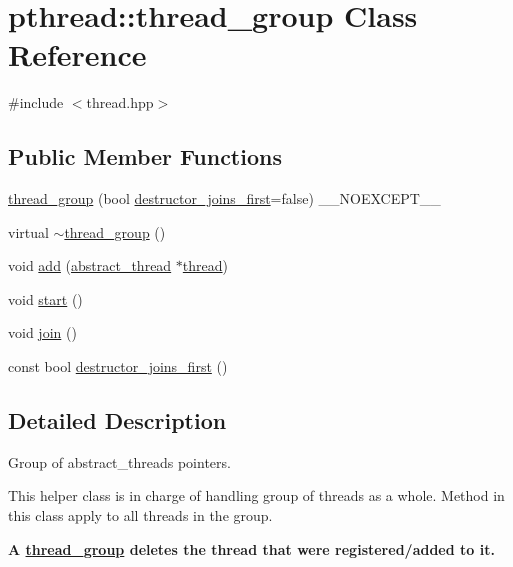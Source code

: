 \hypertarget{classpthread_1_1thread__group}{}\section{pthread\+:\+:thread\+\_\+group Class Reference}
\label{classpthread_1_1thread__group}


{\ttfamily \#include $<$thread.\+hpp$>$}

\subsection*{Public Member Functions}
\begin{DoxyCompactItemize}
\item 
\hyperlink{classpthread_1_1thread__group_ab4a8be5396449131ce2817db0e6ea2c2}{thread\+\_\+group} (bool \hyperlink{classpthread_1_1thread__group_a67df7bb484fb8657228a909a126489d3}{destructor\+\_\+joins\+\_\+first}=false) \+\_\+\+\_\+\+N\+O\+E\+X\+C\+E\+P\+T\+\_\+\+\_\+
\item 
virtual \hyperlink{classpthread_1_1thread__group_a2aeeb86d1523e2a7c175df3162331e4f}{$\sim$thread\+\_\+group} ()
\item 
void \hyperlink{classpthread_1_1thread__group_ae9fa9ce6e7b4c2222d04a446b3c23ca0}{add} (\hyperlink{classpthread_1_1abstract__thread}{abstract\+\_\+thread} $\ast$\hyperlink{classpthread_1_1thread}{thread})
\item 
void \hyperlink{classpthread_1_1thread__group_aaba00cf80d72cd986526384482457968}{start} ()
\item 
void \hyperlink{classpthread_1_1thread__group_a39937a77e1059e352c9b39407a866f6e}{join} ()
\item 
const bool \hyperlink{classpthread_1_1thread__group_a67df7bb484fb8657228a909a126489d3}{destructor\+\_\+joins\+\_\+first} ()
\end{DoxyCompactItemize}


\subsection{Detailed Description}
Group of abstract\+\_\+threads pointers.

This helper class is in charge of handling group of threads as a whole. Method in this class apply to all threads in the group.

{\bfseries A \hyperlink{classpthread_1_1thread__group}{thread\+\_\+group} deletes the thread that were registered/added to it.}


